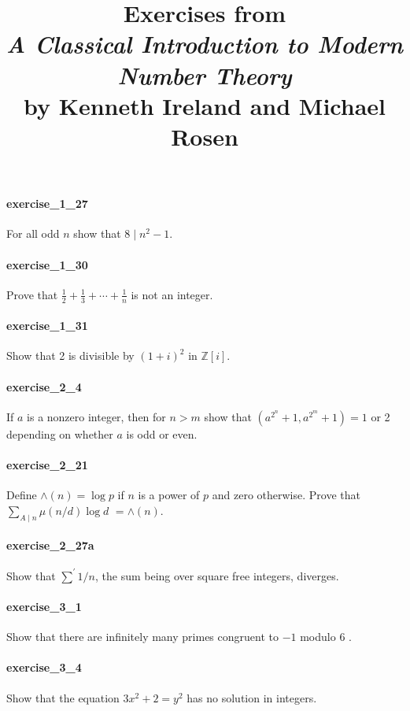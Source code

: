 \documentclass{article}
\title{\textbf{
Exercises from \\
\textit{A Classical Introduction to Modern Number Theory} \\
by Kenneth Ireland and Michael Rosen
}}
\date{}
\begin{document}
\maketitle

\paragraph{exercise\_1\_27} For all odd $n$ show that $8 \mid n^{2}-1$.

\paragraph{exercise\_1\_30} Prove that $\frac{1}{2}+\frac{1}{3}+\cdots+\frac{1}{n}$ is not an integer.

\paragraph{exercise\_1\_31} Show that 2 is divisible by $(1+i)^{2}$ in $\mathbb{Z}[i]$.

\paragraph{exercise\_2\_4} If $a$ is a nonzero integer, then for $n>m$ show that $\left(a^{2^{n}}+1, a^{2^{m}}+1\right)=1$ or 2 depending on whether $a$ is odd or even.

\paragraph{exercise\_2\_21} Define $\wedge(n)=\log p$ if $n$ is a power of $p$ and zero otherwise. Prove that $\sum_{A \mid n} \mu(n / d) \log d$ $=\wedge(n)$.

\paragraph{exercise\_2\_27a} Show that $\sum^{\prime} 1 / n$, the sum being over square free integers, diverges.

\paragraph{exercise\_3\_1} Show that there are infinitely many primes congruent to $-1$ modulo 6 .

\paragraph{exercise\_3\_4} Show that the equation $3 x^{2}+2=y^{2}$ has no solution in integers.
\end{document}
